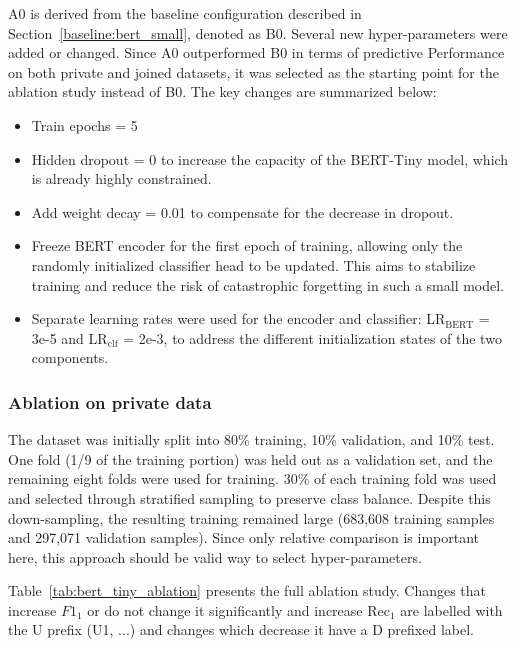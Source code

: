 A0 is derived from the baseline configuration described in Section~\ref{baseline:bert_small}, denoted as B0. Several new hyper-parameters were added or changed. Since A0 outperformed B0 in terms of predictive Performance on both private and joined datasets, it was selected as the starting point for the ablation study instead of B0. The key changes are summarized below:

\begin{itemize}
    \item Train epochs = 5
    \item Hidden dropout = 0 to increase the capacity of the BERT-Tiny model, which is already highly constrained.
    \item Add weight decay = 0.01 to compensate for the decrease in dropout.
    \item Freeze BERT encoder for the first epoch of training, allowing only the randomly initialized classifier head to be updated. This aims to stabilize training and reduce the risk of catastrophic forgetting in such a small model.
    \item Separate learning rates were used for the encoder and classifier: LR$_{\text{BERT}}$ = 3e-5 and LR$_{\text{clf}}$ = 2e-3, to address the different initialization states of the two components.
\end{itemize}

\subsubsection*{Ablation on private data}
\label{sec:private_ablation}
The dataset was initially split into 80\% training, 10\% validation, and 10\% test. One fold (1/9 of the training portion) was held out as a validation set, and the remaining eight folds were used for training. 30\% of each training fold was used and selected through stratified sampling to preserve class balance. Despite this down-sampling, the resulting training remained large (683,608 training samples and 297,071 validation samples). Since only relative comparison is important here, this approach should be valid way to select hyper-parameters.

Table~\ref{tab:bert_tiny_ablation} presents the full ablation study. Changes that increase $F1_1$ or do not change it significantly and increase Rec$_1$ are labelled with the U prefix (U1, ...) and changes which decrease it have a D prefixed label.

